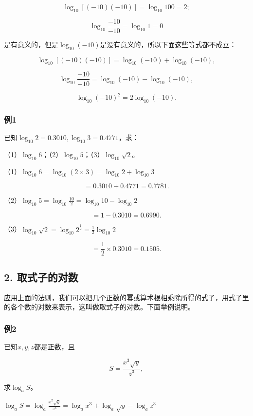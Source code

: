 \[
\log_{10} [ (- 10) (- 10) ] = \log_{10} 100 = 2;
\]

\[
\log_{10} \frac{- 10}{- 10} = \log_{10} 1 = 0
\]

是有意义的，但是\(\log_{10}(-10)\)是没有意义的，所以下面这些等式都不成立：

\[
\log_{10} [ (- 10) (- 10) ] = \log_{10} (- 10) + \log_{10} (- 10),
\]

\[
\log_{10} \frac{- 10}{- 10} = \log_{10} (- 10) - \log_{10} (- 10),
\]

\[
\log_{10} (- 10)^{2} = 2 \log_{10} (- 10).
\]

\subsubsection{例1}

已知\(\log_{10}2=0.3010,\log_{10}3=0.4771\)，求：

（1）\(\log_{10}6\)；（2）\(\log_{10}5\)；（3）\(\log_{10}\sqrt{2}\)。

（1）\(\log_{10}6 = \log_{10}(2\times 3) = \log_{10}2+\log_{10}3\)

\[
= 0.3010 + 0.4771 = 0.7781.
\]

（2）\(\log_{10}5 = \log_{10}\frac{10}{2} = \log_{10}10 - \log_{10}2\)

\[
= 1 - 0.3010 = 0.6990.
\]

（3）\(\log_{10}\sqrt{2} = \log_{10}2^{\frac{1}{2}} = \frac{1}{2}\log_{10}2\)

\[
= \frac{1}{2} \times 0.3010 = 0.1505.
\]

\subsection{2. 取式子的对数}

应用上面的法则，我们可以把几个正数的幂或算术根相乘除所得的式子，用式子里的各个数的对数来表示，这叫做取式子的对数。下面举例说明。

\subsubsection{例2}

已知\(x, y, z\)都是正数，且

\[
S = \frac{x^{3} \sqrt{y}}{z^{3}},
\]

求\(\log_a S\)。

\(\log_a S = \log_a \frac{x^2 \sqrt{y}}{z^3} = \log_a x^3 + \log_a \sqrt{y} - \log_a z^3\)


